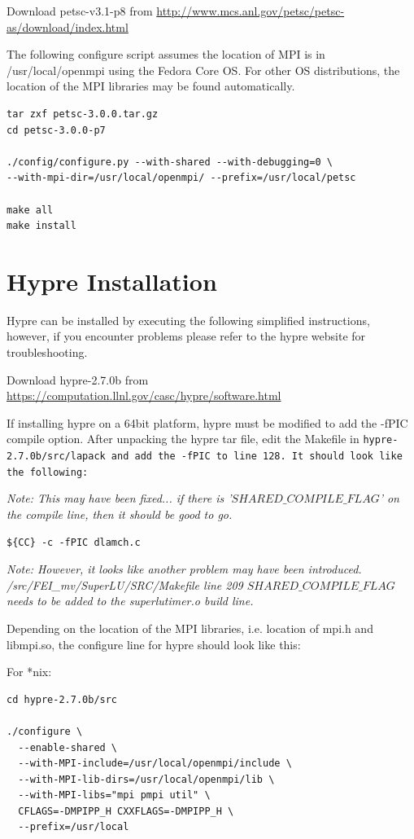 \documentclass[12pt]{article}
\begin{document}
Download petsc-v3.1-p8 from
\url{http://www.mcs.anl.gov/petsc/petsc-as/download/index.html}

The following configure script assumes the location of MPI is in
/usr/local/openmpi using the Fedora Core OS.  For other OS
distributions, the location of the MPI libraries may be found
automatically.

\begin{Verbatim}
tar zxf petsc-3.0.0.tar.gz
cd petsc-3.0.0-p7

./config/configure.py --with-shared --with-debugging=0 \ 
--with-mpi-dir=/usr/local/openmpi/ --prefix=/usr/local/petsc

make all
make install
\end{Verbatim}

\section{Hypre Installation}

Hypre can be installed by executing the following simplified
instructions, however, if you encounter problems please refer to the
hypre website for troubleshooting.

Download hypre-2.7.0b from
\url{https://computation.llnl.gov/casc/hypre/software.html}

If installing hypre on a 64bit platform, hypre must be modified to add
the -fPIC compile option.  After unpacking the hypre tar file, edit
the Makefile in \tt hypre-2.7.0b/src/lapack \normalfont and add the
-fPIC to line 128.  It should look like the following:

\emph{Note: This may have been fixed... if there is
  '${SHARED\_COMPILE\_FLAG}$' on the compile line, then it should be good
to go.}

\begin{verbatim}
${CC} -c -fPIC dlamch.c
\end{verbatim}

\emph{Note: However, it looks like another problem may have been
  introduced.  /src/FEI\_mv/SuperLU/SRC/Makefile line 209
  ${SHARED\_COMPILE\_FLAG}$ needs to be added to the superlutimer.o
  build line.
}

Depending on the location of the MPI libraries, i.e. location of mpi.h
and libmpi.so, the configure line for hypre should look like this:

For *nix:

\begin{verbatim}
cd hypre-2.7.0b/src

./configure \
  --enable-shared \
  --with-MPI-include=/usr/local/openmpi/include \
  --with-MPI-lib-dirs=/usr/local/openmpi/lib \
  --with-MPI-libs="mpi pmpi util" \
  CFLAGS=-DMPIPP_H CXXFLAGS=-DMPIPP_H \
  --prefix=/usr/local
\end{verbatim}
\end{document}

